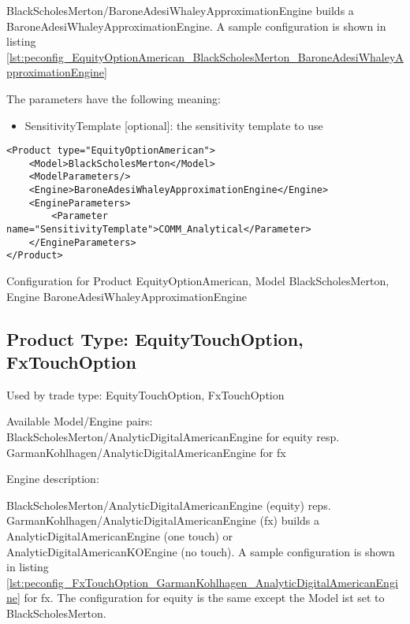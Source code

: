 BlackScholesMerton/BaroneAdesiWhaleyApproximationEngine builds a BaroneAdesiWhaleyApproximationEngine. A sample configuration is shown in listing
\ref{lst:peconfig_EquityOptionAmerican_BlackScholesMerton_BaroneAdesiWhaleyApproximationEngine}

The parameters have the following meaning:

\begin{itemize}
\item SensitivityTemplate [optional]: the sensitivity template to use 
\end{itemize}

\begin{longlisting}
\begin{verbatim}
<Product type="EquityOptionAmerican">
    <Model>BlackScholesMerton</Model>
    <ModelParameters/>
    <Engine>BaroneAdesiWhaleyApproximationEngine</Engine>
    <EngineParameters>
        <Parameter name="SensitivityTemplate">COMM_Analytical</Parameter>
    </EngineParameters>
</Product>
\end{verbatim}
\caption{Configuration for Product EquityOptionAmerican, Model BlackScholesMerton, Engine BaroneAdesiWhaleyApproximationEngine}
\label{lst:peconfig_EquityOptionAmerican_BlackScholesMerton_BaroneAdesiWhaleyApproximationEngine}
\end{longlisting}

\subsection{Product Type: EquityTouchOption, FxTouchOption}

Used by trade type: EquityTouchOption, FxTouchOption

Available Model/Engine pairs: BlackScholesMerton/AnalyticDigitalAmericanEngine for equity
resp. GarmanKohlhagen/AnalyticDigitalAmericanEngine for fx

Engine description:

BlackScholesMerton/AnalyticDigitalAmericanEngine (equity) reps. GarmanKohlhagen/AnalyticDigitalAmericanEngine (fx)
builds a AnalyticDigitalAmericanEngine (one touch) or AnalyticDigitalAmericanKOEngine (no touch). A sample configuration
is shown in listing \ref{lst:peconfig_FxTouchOption_GarmanKohlhagen_AnalyticDigitalAmericanEngine} for fx. The
configuration for equity is the same except the Model ist set to BlackScholesMerton.

